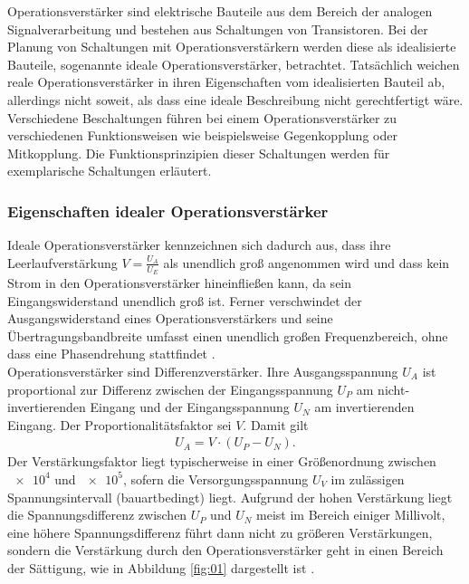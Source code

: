 Operationsverstärker sind elektrische Bauteile aus dem Bereich der analogen
Signalverarbeitung und bestehen aus Schaltungen von Transistoren. Bei der
Planung von Schaltungen mit Operationsverstärkern werden diese als idealisierte
Bauteile, sogenannte ideale Operationsverstärker, betrachtet. Tatsächlich
weichen reale Operationsverstärker in ihren Eigenschaften vom idealisierten
Bauteil ab, allerdings nicht soweit, als dass eine ideale Beschreibung nicht
gerechtfertigt wäre. \\
\noindent Verschiedene Beschaltungen führen bei einem Operationsverstärker zu
verschiedenen Funktionsweisen wie beispielsweise Gegenkopplung oder
Mitkopplung. Die Funktionsprinzipien dieser Schaltungen werden für exemplarische
Schaltungen erläutert.
\subsubsection{Eigenschaften idealer Operationsverstärker}
Ideale Operationsverstärker kennzeichnen sich dadurch aus, dass ihre
Leerlaufverstärkung $V = \frac{U_A}{U_E}$ als unendlich groß angenommen wird und
dass kein Strom in den Operationsverstärker hineinfließen kann, da sein
Eingangswiderstand unendlich groß ist. Ferner verschwindet der
Ausgangswiderstand eines Operationsverstärkers und seine Übertragungsbandbreite
umfasst einen unendlich großen Frequenzbereich, ohne dass eine Phasendrehung
stattfindet \cite{federau}. \\
\noindent Operationsverstärker sind Differenzverstärker. Ihre Ausgangsspannung $U_A$
ist proportional zur Differenz zwischen der Eingangsspannung $U_P$ am
nicht-invertierenden Eingang und der Eingangsspannung $U_N$ am
invertierenden Eingang. Der Proportionalitätsfaktor sei $V$. Damit gilt
\begin{align}
  U_A = V \cdot \left(U_P - U_N \right).
  \label{eqn:01}
\end{align}
\noindent Der Verstärkungsfaktor liegt typischerweise in einer Größenordnung
zwischen $\num{e4}$ und $\num{e5}$, sofern die Versorgungsspannung $U_V$ im
zulässigen Spannungsintervall (bauartbedingt) liegt. Aufgrund der hohen
Verstärkung liegt die Spannungsdifferenz zwischen $U_P$ und $U_N$ meist im
Bereich einiger Millivolt, eine höhere Spannungsdifferenz führt dann nicht
zu größeren Verstärkungen, sondern die Verstärkung durch den Operationsverstärker
geht in einen Bereich der Sättigung, wie in Abbildung \ref{fig:01} dargestellt ist
\cite{hs-fulda}. \\
\FloatBarrier
